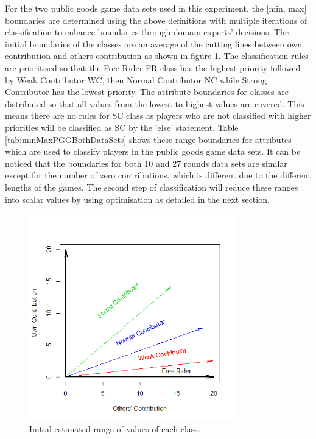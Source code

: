 For the two public goods game data sets used in this experiment, the [min, max] boundaries are determined using the above definitions with multiple iterations of classification to enhance boundaries through domain experts' decisions. The initial boundaries of the classes are an average of the cutting lines between own contribution and others contribution as shown in figure \ref{fig:estimate}. The classification rules are prioritised so that the Free Rider FR class has the highest priority followed by Weak Contributor WC, then Normal Contributor NC while Strong Contributor has the lowest priority. The attribute boundaries for classes are distributed so that all values from the lowest to highest values are covered. This means there are no rules for SC class as players who are not classified with higher priorities will be classified as SC by the 'else' statement. Table \ref{tab:minMaxPGGBothDataSets} shows these range boundaries for attributes which are used to classify players in the public goods game data sets. It can be noticed that the boundaries for both 10 and 27 rounds data sets are similar except for the number of zero contributions, which is different due to the different lengths of the games. The second step of classification will reduce these ranges into scalar values by using optimisation as detailed in the next section.

\begin{figure}[!h]
    \centering
    \includegraphics[width=0.8\textwidth]{images/chapter5/estimate.png}
    \caption{Initial estimated range of values of each class.}
    \label{fig:estimate}
\end{figure}


